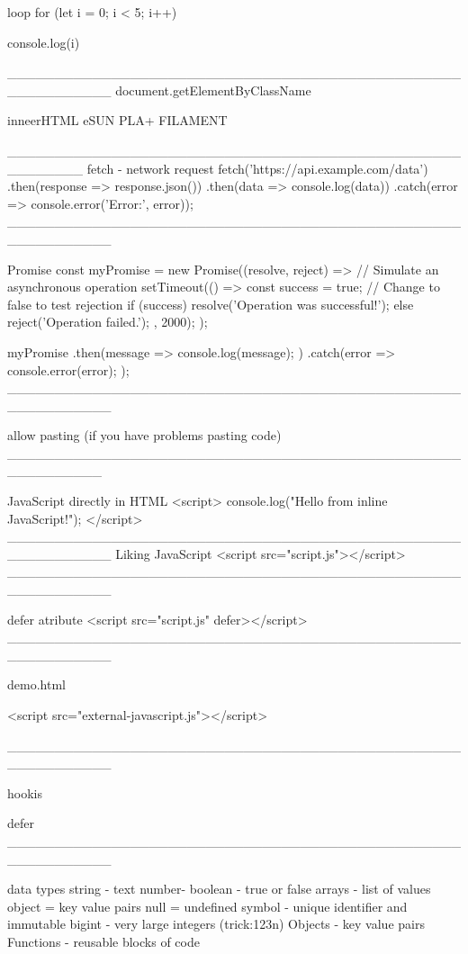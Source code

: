 loop
for (let i = 0; i < 5; i++) {
    console.log(i)

___________________________________________________________
document.getElementByClassName

inneerHTML
eSUN PLA+ FILAMENT

________________________________________________________    
fetch - network request
fetch('https://api.example.com/data')
  .then(response => response.json())
  .then(data => console.log(data))
  .catch(error => console.error('Error:', error));
  ___________________________________________________________   

  Promise
    const myPromise = new Promise((resolve, reject) => {
      // Simulate an asynchronous operation
      setTimeout(() => {
        const success = true; // Change to false to test rejection
        if (success) {
          resolve('Operation was successful!');
        } else {
          reject('Operation failed.');
        }
      }, 2000);
    });

    myPromise
      .then(message => {
        console.log(message);
      })
      .catch(error => {
        console.error(error);
      });
___________________________________________________________

allow pasting (if you have problems pasting code)
__________________________________________________________

JavaScript directly in HTML
<script>
  console.log("Hello from inline JavaScript!");
</script>
___________________________________________________________
Liking JavaScript
<script src="script.js"></script>
___________________________________________________________


defer atribute
<script src="script.js" defer></script>
___________________________________________________________

demo.html

<script src="external-javascript.js"></script>

___________________________________________________________

hookis 

defer 
___________________________________________________________

data types
string - text
number- 
boolean - true or false
arrays - list of values
object = key value pairs
null =
undefined
symbol - unique identifier and immutable
bigint - very large integers (trick:123n)
Objects - key value pairs
Functions - reusable blocks of code

}
